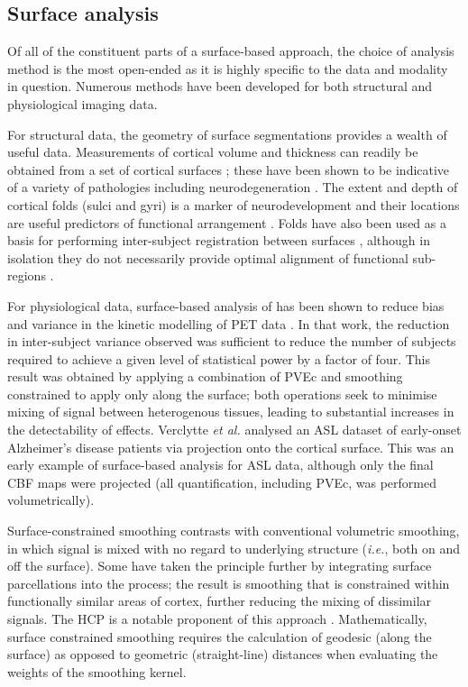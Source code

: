 \subsection{Surface analysis}

Of all of the constituent parts of a surface-based approach, the choice of analysis method is the most open-ended as it is highly specific to the data and modality in question. Numerous methods have been developed for both structural and physiological imaging data. 

For structural data, the geometry of surface segmentations provides a wealth of useful data. Measurements of cortical volume and thickness can readily be obtained from a set of cortical surfaces \cite{Fischl1999a}; these have been shown to be indicative of a variety of pathologies including neurodegeneration \cite{Harvey1993, Rimol2012, Knopman2016, Lin2017}. The extent and depth of cortical folds (sulci and gyri) is a marker of neurodevelopment \cite{Tamnes2017, Garcia2018} and their locations are useful predictors of functional arrangement \cite{Fischl2008}. Folds have also been used as a basis for performing inter-subject registration between surfaces \cite{Lyttelton2007}, although in isolation they do not necessarily provide optimal alignment of functional sub-regions \cite{Robinson2013}. 

For physiological data, surface-based analysis of has been shown to reduce bias and variance in the kinetic modelling of PET data \cite{Greve2014}. In that work, the reduction in inter-subject variance observed was sufficient to reduce the number of subjects required to achieve a given level of statistical power by a factor of four. This result was obtained by applying a combination of PVEc and smoothing constrained to apply only along the surface; both operations seek to minimise mixing of signal between heterogenous tissues, leading to substantial increases in the detectability of effects. Verclytte \textit{et al.} \cite{Verclytte2015} analysed an ASL dataset of early-onset Alzheimer's disease patients via projection onto the cortical surface. This was an early example of surface-based analysis for ASL data, although only the final CBF maps were projected (all quantification, including PVEc, was performed volumetrically). 

Surface-constrained smoothing contrasts with conventional volumetric smoothing, in which signal is mixed with no regard to underlying structure (\textit{i.e.}, both on and off the surface). Some have taken the principle further by integrating surface parcellations into the process; the result is smoothing that is constrained within functionally similar areas of cortex, further reducing the mixing of dissimilar signals. The HCP is a notable proponent of this approach \cite{Glasser2013, Coalson2017}. Mathematically, surface constrained smoothing requires the calculation of geodesic (along the surface) as opposed to geometric (straight-line) distances when evaluating the weights of the smoothing kernel. 

